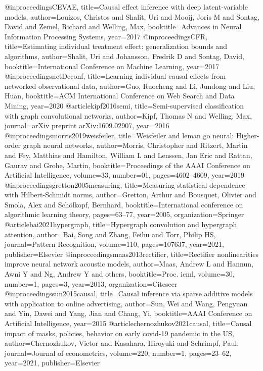 @inproceedings{CEVAE,
  title={Causal effect inference with deep latent-variable models},
  author={Louizos, Christos and Shalit, Uri and Mooij, Joris M and Sontag, David and Zemel, Richard and Welling, Max},
  booktitle={Advances in Neural Information Processing Systems},
  year={2017}
}
@inproceedings{CFR,
  title={Estimating individual treatment effect: generalization bounds and algorithms},
  author={Shalit, Uri and Johansson, Fredrik D and Sontag, David},
  booktitle={International Conference on Machine Learning},
  year={2017}
}
@inproceedings{netDeconf,
  title={Learning individual causal effects from networked observational data},
  author={Guo, Ruocheng and Li, Jundong and Liu, Huan},
  booktitle={ACM International Conference on Web Search and Data Mining},
  year={2020}
}
@article{kipf2016semi,
  title={Semi-supervised classification with graph convolutional networks},
  author={Kipf, Thomas N and Welling, Max},
  journal={arXiv preprint arXiv:1609.02907},
  year={2016}
}
@inproceedings{morris2019weisfeiler,
  title={Weisfeiler and leman go neural: Higher-order graph neural networks},
  author={Morris, Christopher and Ritzert, Martin and Fey, Matthias and Hamilton, William L and Lenssen, Jan Eric and Rattan, Gaurav and Grohe, Martin},
  booktitle={Proceedings of the AAAI Conference on Artificial Intelligence},
  volume={33},
  number={01},
  pages={4602--4609},
  year={2019}
}
@inproceedings{gretton2005measuring,
  title={Measuring statistical dependence with Hilbert-Schmidt norms},
  author={Gretton, Arthur and Bousquet, Olivier and Smola, Alex and Sch{\"o}lkopf, Bernhard},
  booktitle={International conference on algorithmic learning theory},
  pages={63--77},
  year={2005},
  organization={Springer}
}
@article{bai2021hypergraph,
  title={Hypergraph convolution and hypergraph attention},
  author={Bai, Song and Zhang, Feihu and Torr, Philip HS},
  journal={Pattern Recognition},
  volume={110},
  pages={107637},
  year={2021},
  publisher={Elsevier}
}
@inproceedings{maas2013rectifier,
  title={Rectifier nonlinearities improve neural network acoustic models},
  author={Maas, Andrew L and Hannun, Awni Y and Ng, Andrew Y and others},
  booktitle={Proc. icml},
  volume={30},
  number={1},
  pages={3},
  year={2013},
  organization={Citeseer}
}
@inproceedings{sun2015causal,
  title={Causal inference via sparse additive models with application to online advertising},
  author={Sun, Wei and Wang, Pengyuan and Yin, Dawei and Yang, Jian and Chang, Yi},
  booktitle={AAAI Conference on Artificial Intelligence},
  year={2015}
}
@article{chernozhukov2021causal,
  title={Causal impact of masks, policies, behavior on early covid-19 pandemic in the US},
  author={Chernozhukov, Victor and Kasahara, Hiroyuki and Schrimpf, Paul},
  journal={Journal of econometrics},
  volume={220},
  number={1},
  pages={23--62},
  year={2021},
  publisher={Elsevier}
}
